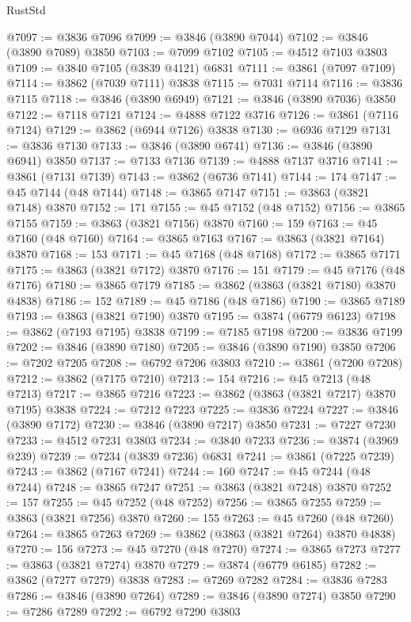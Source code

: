 \begin{lexlean}{RustStd}
\begin{coremodule}
@7097 := @3836 @7096
@7099 := @3846 (@3890 @7044)
@7102 := @3846 (@3890 @7089) @3850
@7103 := @7099 @7102
@7105 := @4512 @7103 @3803
@7109 := @3840 @7105 (@3839 @4121) @6831
@7111 := @3861 (@7097 @7109)
@7114 := @3862 (@7039 @7111) @3838
@7115 := @7031 @7114
@7116 := @3836 @7115
@7118 := @3846 (@3890 @6949)
@7121 := @3846 (@3890 @7036) @3850
@7122 := @7118 @7121
@7124 := @4888 @7122 @3716
@7126 := @3861 (@7116 @7124)
@7129 := @3862 (@6944 @7126) @3838
@7130 := @6936 @7129
@7131 := @3836 @7130
@7133 := @3846 (@3890 @6741)
@7136 := @3846 (@3890 @6941) @3850
@7137 := @7133 @7136
@7139 := @4888 @7137 @3716
@7141 := @3861 (@7131 @7139)
@7143 := @3862 (@6736 @7141)
@7144 := 174
@7147 := @45 @7144 (@48 @7144)
@7148 := @3865 @7147
@7151 := @3863 (@3821 @7148) @3870
@7152 := 171
@7155 := @45 @7152 (@48 @7152)
@7156 := @3865 @7155
@7159 := @3863 (@3821 @7156) @3870
@7160 := 159
@7163 := @45 @7160 (@48 @7160)
@7164 := @3865 @7163
@7167 := @3863 (@3821 @7164) @3870
@7168 := 153
@7171 := @45 @7168 (@48 @7168)
@7172 := @3865 @7171
@7175 := @3863 (@3821 @7172) @3870
@7176 := 151
@7179 := @45 @7176 (@48 @7176)
@7180 := @3865 @7179
@7185 := @3862 (@3863 (@3821 @7180) @3870 @4838)
@7186 := 152
@7189 := @45 @7186 (@48 @7186)
@7190 := @3865 @7189
@7193 := @3863 (@3821 @7190) @3870
@7195 := @3874 (@6779 @6123)
@7198 := @3862 (@7193 @7195) @3838
@7199 := @7185 @7198
@7200 := @3836 @7199
@7202 := @3846 (@3890 @7180)
@7205 := @3846 (@3890 @7190) @3850
@7206 := @7202 @7205
@7208 := @6792 @7206 @3803
@7210 := @3861 (@7200 @7208)
@7212 := @3862 (@7175 @7210)
@7213 := 154
@7216 := @45 @7213 (@48 @7213)
@7217 := @3865 @7216
@7223 := @3862 (@3863 (@3821 @7217) @3870 @7195) @3838
@7224 := @7212 @7223
@7225 := @3836 @7224
@7227 := @3846 (@3890 @7172)
@7230 := @3846 (@3890 @7217) @3850
@7231 := @7227 @7230
@7233 := @4512 @7231 @3803
@7234 := @3840 @7233
@7236 := @3874 (@3969 @239)
@7239 := @7234 (@3839 @7236) @6831
@7241 := @3861 (@7225 @7239)
@7243 := @3862 (@7167 @7241)
@7244 := 160
@7247 := @45 @7244 (@48 @7244)
@7248 := @3865 @7247
@7251 := @3863 (@3821 @7248) @3870
@7252 := 157
@7255 := @45 @7252 (@48 @7252)
@7256 := @3865 @7255
@7259 := @3863 (@3821 @7256) @3870
@7260 := 155
@7263 := @45 @7260 (@48 @7260)
@7264 := @3865 @7263
@7269 := @3862 (@3863 (@3821 @7264) @3870 @4838)
@7270 := 156
@7273 := @45 @7270 (@48 @7270)
@7274 := @3865 @7273
@7277 := @3863 (@3821 @7274) @3870
@7279 := @3874 (@6779 @6185)
@7282 := @3862 (@7277 @7279) @3838
@7283 := @7269 @7282
@7284 := @3836 @7283
@7286 := @3846 (@3890 @7264)
@7289 := @3846 (@3890 @7274) @3850
@7290 := @7286 @7289
@7292 := @6792 @7290 @3803

\end{coremodule}
\end{lexlean}

